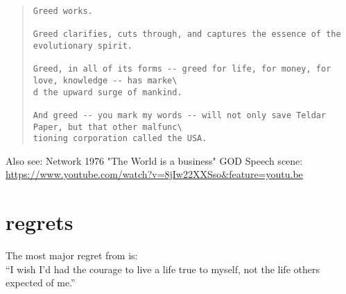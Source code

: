 \documentclass[10pt, letterpaper]{article}
\begin{document}
\begin{spacing}{1.8}
\begin{quote}
\begin{verbatim}
Greed works.                                                                              
                                                                                          
Greed clarifies, cuts through, and captures the essence of the evolutionary spirit.       
                                                                                          
Greed, in all of its forms -- greed for life, for money, for love, knowledge -- has marke\
d the upward surge of mankind.                                                            
                                                                                          
And greed -- you mark my words -- will not only save Teldar Paper, but that other malfunc\
tioning corporation called the USA.                                                       
\end{verbatim}
\end{quote}

Also see: 
Network 1976 "The World is a business" GOD Speech scene:
\url{https://www.youtube.com/watch?v=8jIw22XXSso&feature=youtu.be}

\section{regrets}

The most major regret from \cite{ware12} is:\\

``I wish I'd had the courage to live a life true to myself, not the life others
expected of me.''\\


\end{spacing}
\end{document}
